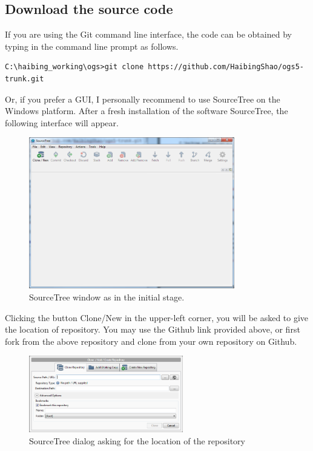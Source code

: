 \subsection{Download the source code}
If you are using the Git command line interface, the code can be obtained by typing in the command line prompt as follows.  
\begin{Verbatim}
C:\haibing_working\ogs>git clone https://github.com/HaibingShao/ogs5-trunk.git
\end{Verbatim}
Or, if you prefer a GUI, I personally recommend to use SourceTree on the Windows platform. After a fresh installation of the software SourceTree, the following interface will appear. 
\begin{figure}
\begin{center}
\includegraphics[width=0.8\textwidth]{fig/sourcetree_initial}
\end{center}
\caption{SourceTree window as in the initial stage.}
\label{fig:sourcetree_initial}
\end{figure}
Clicking the button Clone/New in the upper-left corner, you will be asked to give the location of repository. You may use the Github link provided above, or first fork from the above repository and clone from your own repository on Github. 
\begin{figure}
\begin{center}
\includegraphics[width=0.6\textwidth]{fig/sourcetree_repo_dialog}
\end{center}
\caption{SourceTree dialog asking for the location of the repository}
\label{fig:sourcetree_repo_dialog}
\end{figure}
